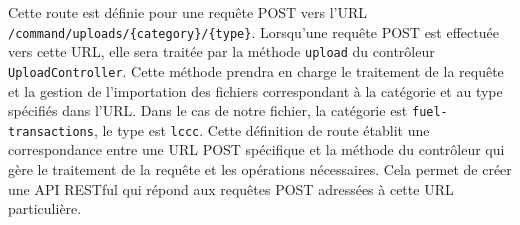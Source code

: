 Cette route est définie pour une requête POST vers l'URL \Verb|/command/uploads/{category}/{type}|. Lorsqu'une requête POST est effectuée vers cette URL, elle sera traitée par la méthode \Verb|upload| du contrôleur \Verb|UploadController|. Cette méthode prendra en charge le traitement de la requête et la gestion de l'importation des fichiers correspondant à la catégorie et au type spécifiés dans l'URL. Dans le cas de notre fichier, la catégorie est \Verb|fuel-transactions|, le type est \Verb|lccc|. Cette définition de route établit une correspondance entre une URL POST spécifique et la méthode du contrôleur qui gère le traitement de la requête et les opérations nécessaires. Cela permet de créer une API RESTful qui répond aux requêtes POST adressées à cette URL particulière.




